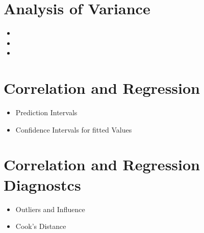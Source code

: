 \documentclass[12pt]{article}
\begin{document}
\section{Analysis of Variance}
\begin{itemize}
\item
\item
\item 
\end{itemize}
\section{Correlation and Regression}
\begin{itemize}
\item Prediction Intervals
\item Confidence Intervals for fitted Values
\end{itemize}


\section{Correlation and Regression Diagnostcs}
\begin{itemize}
\item Outliers and Influence
\item Cook's Distance
\end{itemize}
\end{document}
